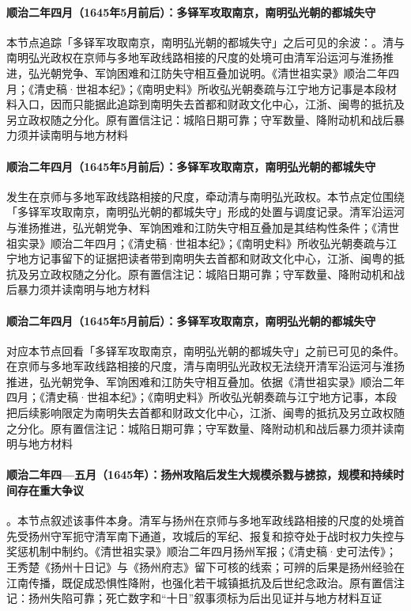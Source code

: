 \paragraph{顺治二年四月（1645年5月前后）：多铎军攻取南京，南明弘光朝的都城失守}
本节点追踪「多铎军攻取南京，南明弘光朝的都城失守」之后可见的余波：。清与南明弘光政权在京师与多地军政线路相接的尺度的处境可由清军沿运河与淮扬推进，弘光朝党争、军饷困难和江防失守相互叠加说明。《清世祖实录》顺治二年四月；《清史稿·世祖本纪》；《南明史料》所收弘光朝奏疏与江宁地方记事是本段材料入口，因而只能据此追踪到南明失去首都和财政文化中心，江浙、闽粤的抵抗及另立政权随之分化。原有置信注记：城陷日期可靠；守军数量、降附动机和战后暴力须并读南明与地方材料

\paragraph{顺治二年四月（1645年5月前后）：多铎军攻取南京，南明弘光朝的都城失守}
 发生在京师与多地军政线路相接的尺度，牵动清与南明弘光政权。本节点定位围绕「多铎军攻取南京，南明弘光朝的都城失守」形成的处置与调度记录。清军沿运河与淮扬推进，弘光朝党争、军饷困难和江防失守相互叠加是其结构性条件；《清世祖实录》顺治二年四月；《清史稿·世祖本纪》；《南明史料》所收弘光朝奏疏与江宁地方记事留下的证据把读者带到南明失去首都和财政文化中心，江浙、闽粤的抵抗及另立政权随之分化。原有置信注记：城陷日期可靠；守军数量、降附动机和战后暴力须并读南明与地方材料

\paragraph{顺治二年四月（1645年5月前后）：多铎军攻取南京，南明弘光朝的都城失守}
 对应本节点回看「多铎军攻取南京，南明弘光朝的都城失守」之前已可见的条件。在京师与多地军政线路相接的尺度，清与南明弘光政权无法绕开清军沿运河与淮扬推进，弘光朝党争、军饷困难和江防失守相互叠加。依据《清世祖实录》顺治二年四月；《清史稿·世祖本纪》；《南明史料》所收弘光朝奏疏与江宁地方记事，本段把后续影响限定为南明失去首都和财政文化中心，江浙、闽粤的抵抗及另立政权随之分化。原有置信注记：城陷日期可靠；守军数量、降附动机和战后暴力须并读南明与地方材料

\paragraph{顺治二年四—五月（1645年）：扬州攻陷后发生大规模杀戮与掳掠，规模和持续时间存在重大争议}
。本节点叙述该事件本身。清军与扬州在京师与多地军政线路相接的尺度的处境首先受扬州守军扼守清军南下通道，攻城后的军纪、报复和掠夺处于战时权力失控与奖惩机制中制约。《清世祖实录》顺治二年四月扬州军报；《清史稿·史可法传》；王秀楚《扬州十日记》与《扬州府志》留下可核的线索；可辨的后果是扬州经验在江南传播，既促成恐惧性降附，也强化若干城镇抵抗及后世纪念政治。原有置信注记：扬州失陷可靠；死亡数字和“十日”叙事须标为后出见证并与地方材料互证


